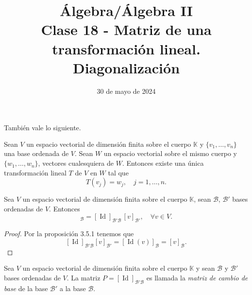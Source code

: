 \documentclass[handout]{beamer} %
\title[Clase 18 -  Matriz de una transformación lineal. Diagonalización]{Álgebra/Álgebra II \\Clase 18 -  Matriz de una transformación lineal. Diagonalización}
\author[]{}
\institute[]{\normalsize FAMAF / UNC
	\\[\baselineskip] ${}^{}$
	\\[\baselineskip]
}
\date[30/05/2024]{30 de mayo de 2024}
\newcommand{\Id}{\operatorname{Id}}
\newcommand{\K}{\mathbb K}
\begin{document}
\begin{frame}
\maketitle
\end{frame}



\begin{frame}
    \pause
También vale  lo siguiente.
\pause
\begin{teorema}\label{th-tl-definida-en-base}
    Sean $V$ un espacio vectorial de dimensión finita sobre el cuerpo $\K$ y $\{v_1,\ldots,v_n\}$  una base ordenada de $V$. Sean $W$ un espacio vectorial sobre el mismo cuerpo y $\{w_1,\ldots,w_n\}$, vectores cualesquiera de $W$. Entonces existe una única transformación  lineal $T$ de $V$ en $W$ tal que
    \begin{equation*}
    T(v_j) = w_j, \quad j=1,\ldots,n.
    \end{equation*}
\end{teorema}

\end{frame}

\begin{frame}
    \begin{corolario}\label{cor-cambio-de-base}
        Sea $V$ un espacio vectorial de dimensión finita sobre el cuerpo $\K$, sean $\mathcal B$, $\mathcal B'$  bases ordenadas de $V$. Entonces 
        \begin{equation*}
            [v]_{\mathcal B} = [\Id]_{\mathcal B' \mathcal B}\, [v]_{\mathcal B'}, \quad \forall v \in V.
        \end{equation*}
    \end{corolario}\pause
    \begin{proof}\pause
        Por la proposición 3.5.1 tenemos que 
        $$
        [\Id]_{\mathcal B' \mathcal B}  [v]_{\mathcal B'} = [\Id (v)]_{\mathcal B} = [v]_{\mathcal B}.
        $$
    \end{proof}
    \pause
    \begin{definicion}
        Sea $V$ un espacio vectorial de dimensión finita sobre el cuerpo $\K$ y sean $\mathcal B$ y $\mathcal B'$ bases ordenadas de $V$. La matriz $P =[\Id]_{\mathcal B' \mathcal B}$  es llamada la \textit{matriz de cambio de base}  de la base $\mathcal B'$  a la base $\mathcal B$. 
    \end{definicion}

    

\end{frame}
\end{document}

